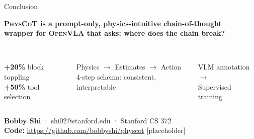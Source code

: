 \documentclass[aspectratio=169,10pt]{beamer}
\newcommand{\physcot}{\textsc{PhysCoT}}
\newcommand{\openvla}{\textsc{OpenVLA}}
\begin{document}
\begin{frame}{Conclusion}
\begin{center}
\begin{tcolorbox}[colback=stanford!8,colframe=stanford,
                  left=10pt,right=10pt,top=8pt,bottom=8pt,
                  boxrule=2pt]
\centering\large
\textbf{\physcot{} is a prompt-only, physics-intuitive chain-of-thought\\
wrapper for \openvla{} that asks: where does the chain break?}
\end{tcolorbox}
\end{center}

\vspace{0.3cm}
\begin{columns}[T]
\begin{center}
{\Huge\textcolor{physgreen}{\faCheckCircle}}\\[4pt]
\textbf{+20\%} block toppling\\
\textbf{+50\%} tool selection
\end{center}

\begin{center}
{\Huge\textcolor{stepB}{\faBrain}}\\[4pt]
Physics $\to$ Estimates $\to$ Action\\
4-step schema: consistent, interpretable
\end{center}

\begin{center}
{\Huge\textcolor{stepD}{\faRoad}}\\[4pt]
VLM annotation $\to$\\
Supervised training
\end{center}
\end{columns}

\vspace{0.5cm}
\begin{center}
\small
\textbf{Bobby Shi} · shi02@stanford.edu · Stanford CS 372\\
\textbf{Code:} \url{https://github.com/bobbyshi/physcot} [placeholder]
\end{center}
\end{frame}

\end{document}
